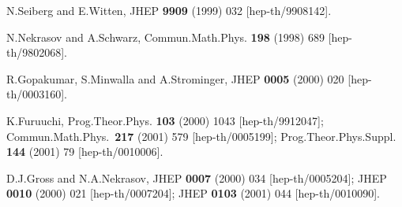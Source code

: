 \documentclass[a4paper,11pt]{article}
\numberwithin{equation}{section}
\newcommand{\R}{{\mathbb{R}}}
\begin{document}
\begin{thebibliography}{99}

N.Seiberg and E.Witten,
JHEP {\bf 9909} (1999) 032 [hep-th/9908142].


N.Nekrasov and A.Schwarz,
Commun.Math.Phys.  {\bf 198} (1998) 689 [hep-th/9802068].


R.Gopakumar, S.Minwalla and A.Strominger,
JHEP {\bf 0005} (2000) 020
[hep-th/0003160].

K.Furuuchi,
Prog.Theor.Phys.  {\bf 103} (2000) 1043 [hep-th/9912047];
Commun.Math.Phys.\  {\bf 217} (2001) 579 [hep-th/0005199];
Prog.Theor.Phys.Suppl. {\bf 144} (2001) 79 [hep-th/0010006].


D.J.Gross and N.A.Nekrasov,
JHEP {\bf 0007} (2000) 034
[hep-th/0005204];
JHEP {\bf 0010} (2000) 021
[hep-th/0007204];
JHEP {\bf 0103} (2001) 044
[hep-th/0010090].


\end{thebibliography}
\end{document}
